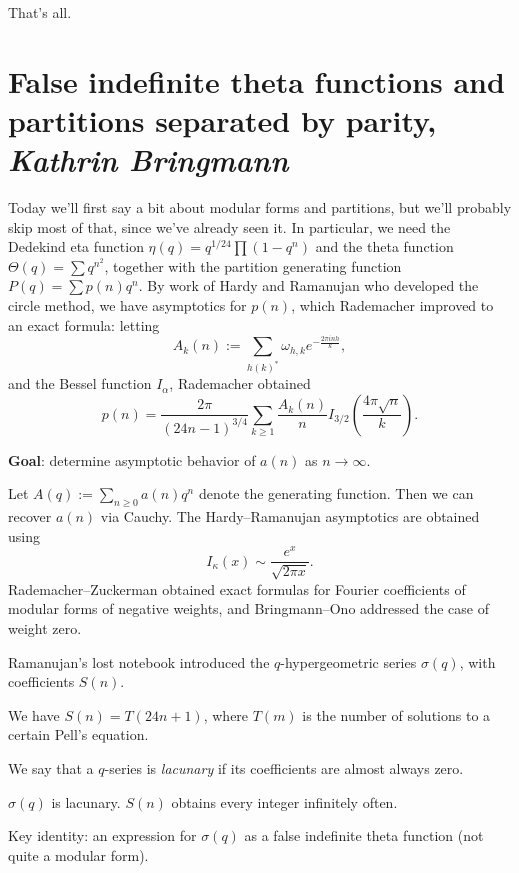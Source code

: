 \documentclass[reqno]{amsart} 
\begin{document}
That's all.

\section{False indefinite theta functions and partitions separated by parity, \textnormal{\emph{Kathrin Bringmann}}}

Today we'll first say a bit about modular forms and partitions, but we'll probably skip most of that, since we've already seen it.  In particular, we need the Dedekind eta function $\eta(q) = q^{1/24} \prod(1 - q^n)$ and the theta function $\Theta(q) = \sum q^{n^2}$, together with the partition generating function $P(q) = \sum p(n) q^n$.  By work of Hardy and Ramanujan who developed the circle method, we have asymptotics for $p(n)$, which Rademacher improved to an exact formula: letting
\begin{equation*}
  A_k(n) := \sum_{h(k)^\ast} \omega_{h, k} e^{- \frac{2 \pi i n h}{k}},
\end{equation*}
and the Bessel function $I_\alpha$, Rademacher obtained
\begin{equation*}
  p(n) = \frac{2 \pi}{(24 n - 1)^{3/4}}
  \sum_{k \geq 1} \frac{A_k(n)}{n}
  I_{3/2} \left( \frac{4 \pi \sqrt{n}}{k} \right).
\end{equation*}

\textbf{Goal}: determine asymptotic behavior of $a(n)$ as $n \rightarrow \infty$.

Let $A(q) := \sum_{n \geq 0} a(n) q^n$ denote the generating function.  Then we can recover $a(n)$ via Cauchy.  The Hardy--Ramanujan asymptotics are obtained using
\begin{equation*}
  I_\kappa(x) \sim \frac{e^x}{ \sqrt{2 \pi x}}.
\end{equation*}
Rademacher--Zuckerman obtained exact formulas for Fourier coefficients of modular forms of negative weights, and Bringmann--Ono addressed the case of weight zero.

Ramanujan's lost notebook introduced the $q$-hypergeometric series $\sigma(q)$, with coefficients $S(n)$.
\begin{theorem}
  We have $S(n) = T(24 n + 1)$, where $T(m)$ is the number of solutions to a certain Pell's equation.
\end{theorem}
\begin{definition}
  We say that a $q$-series is \emph{lacunary} if its coefficients are almost always zero.
\end{definition}
\begin{corollary}
  $\sigma(q)$ is lacunary.  $S(n)$ obtains every integer infinitely often.
\end{corollary}
Key identity: an expression for $\sigma(q)$ as a false indefinite theta function (not quite a modular form).
\end{document}
